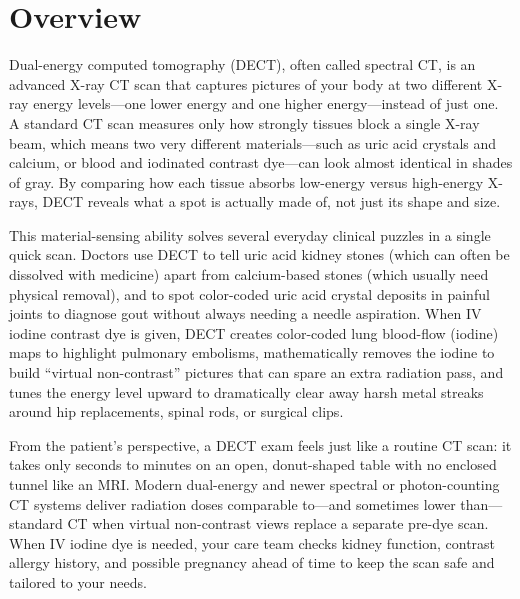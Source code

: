 \label{ch:infographic-dual-energy-ct}

\section{Overview}

Dual-energy computed tomography (DECT), often called spectral CT, is an advanced X-ray CT scan that captures pictures of your body at two different X-ray energy levels---one lower energy and one higher energy---instead of just one. A standard CT scan measures only how strongly tissues block a single X-ray beam, which means two very different materials---such as uric acid crystals and calcium, or blood and iodinated contrast dye---can look almost identical in shades of gray. By comparing how each tissue absorbs low-energy versus high-energy X-rays, DECT reveals what a spot is actually made of, not just its shape and size.

This material-sensing ability solves several everyday clinical puzzles in a single quick scan. Doctors use DECT to tell uric acid kidney stones (which can often be dissolved with medicine) apart from calcium-based stones (which usually need physical removal), and to spot color-coded uric acid crystal deposits in painful joints to diagnose gout without always needing a needle aspiration. When IV iodine contrast dye is given, DECT creates color-coded lung blood-flow (iodine) maps to highlight pulmonary embolisms, mathematically removes the iodine to build ``virtual non-contrast'' pictures that can spare an extra radiation pass, and tunes the energy level upward to dramatically clear away harsh metal streaks around hip replacements, spinal rods, or surgical clips.

From the patient's perspective, a DECT exam feels just like a routine CT scan: it takes only seconds to minutes on an open, donut-shaped table with no enclosed tunnel like an MRI. Modern dual-energy and newer spectral or photon-counting CT systems deliver radiation doses comparable to---and sometimes lower than---standard CT when virtual non-contrast views replace a separate pre-dye scan. When IV iodine dye is needed, your care team checks kidney function, contrast allergy history, and possible pregnancy ahead of time to keep the scan safe and tailored to your needs.

